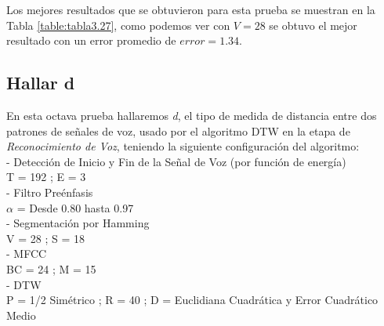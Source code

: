 Los mejores resultados que se obtuvieron para esta prueba se muestran en la Tabla \ref{table:tabla3.27}, como podemos ver con $V = 28$ se obtuvo el mejor resultado con un error promedio de $error = 1.34$.

\subsection{Hallar d}
En esta octava prueba hallaremos \textit{d}, el tipo de medida de distancia entre dos patrones de señales de voz, usado por el algoritmo DTW en la etapa de \textit{Reconocimiento de Voz}, teniendo la siguiente configuración del algoritmo:\\
- Detección de Inicio y Fin de la Señal de Voz (por función de energía) \\
\hspace*{1cm} T = 192 ; \qquad E = 3 \\
- Filtro Preénfasis \\
\hspace*{1cm} $\alpha$ = Desde 0.80 hasta 0.97 \\
- Segmentación por Hamming \\
\hspace*{1cm} V = 28 ; \qquad S = 18 \\
- MFCC \\
\hspace*{1cm} BC = 24 ; \qquad M = 15 \\
- DTW \\
\hspace*{1cm} P = 1/2 Simétrico ;  \qquad R = 40 ; \qquad D = Euclidiana Cuadrática y Error Cuadrático Medio

